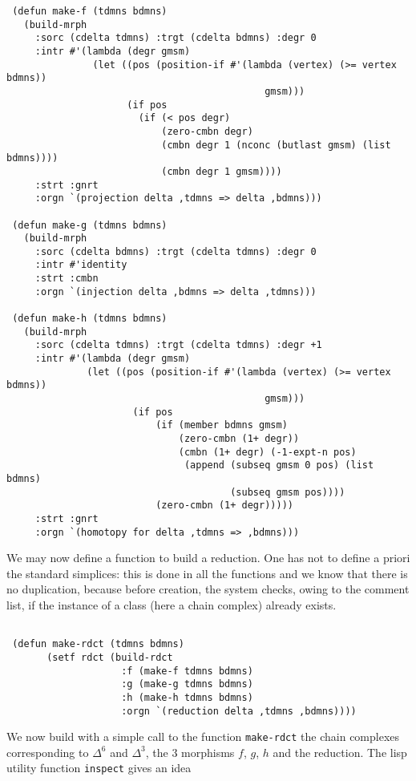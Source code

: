 \newpage
{\footnotesize\begin{verbatim}
 (defun make-f (tdmns bdmns)
   (build-mrph
     :sorc (cdelta tdmns) :trgt (cdelta bdmns) :degr 0
     :intr #'(lambda (degr gmsm)
               (let ((pos (position-if #'(lambda (vertex) (>= vertex bdmns)) 
                                             gmsm)))
                     (if pos
                       (if (< pos degr)
                           (zero-cmbn degr)
                           (cmbn degr 1 (nconc (butlast gmsm) (list bdmns))))
                           (cmbn degr 1 gmsm))))
     :strt :gnrt
     :orgn `(projection delta ,tdmns => delta ,bdmns)))

 (defun make-g (tdmns bdmns)
   (build-mrph
     :sorc (cdelta bdmns) :trgt (cdelta tdmns) :degr 0
     :intr #'identity
     :strt :cmbn
     :orgn `(injection delta ,bdmns => delta ,tdmns)))

 (defun make-h (tdmns bdmns)
   (build-mrph
     :sorc (cdelta tdmns) :trgt (cdelta tdmns) :degr +1
     :intr #'(lambda (degr gmsm)
              (let ((pos (position-if #'(lambda (vertex) (>= vertex bdmns)) 
                                             gmsm)))
                      (if pos
                          (if (member bdmns gmsm)
                              (zero-cmbn (1+ degr))
                              (cmbn (1+ degr) (-1-expt-n pos)
                               (append (subseq gmsm 0 pos) (list bdmns) 
                                       (subseq gmsm pos))))
                          (zero-cmbn (1+ degr)))))
     :strt :gnrt
     :orgn `(homotopy for delta ,tdmns => ,bdmns)))
\end{verbatim}}
We may now define a function to build a reduction. One has not to define a priori the standard
simplices: this is done  in  all the functions and we know that there is no duplication, because
before creation, the system checks,
owing to the comment list, if the instance of a class (here a chain complex) already exists.
{\footnotesize\begin{verbatim}

 (defun make-rdct (tdmns bdmns)
       (setf rdct (build-rdct
                    :f (make-f tdmns bdmns)
                    :g (make-g tdmns bdmns)
                    :h (make-h tdmns bdmns)
                    :orgn `(reduction delta ,tdmns ,bdmns))))
\end{verbatim}}
We now build with a simple call to the function {\tt make-rdct} the chain complexes corresponding 
to $\Delta^6$ and $\Delta^3$, the $3$ morphisms
$f$, $g$, $h$ and the reduction. The lisp utility function {\tt inspect} gives an idea

